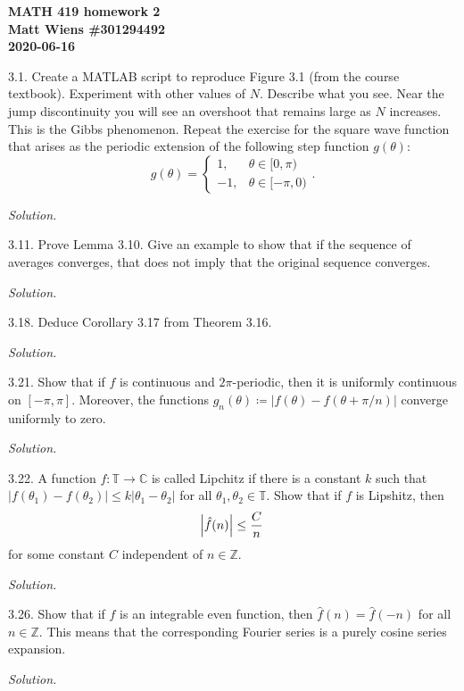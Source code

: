 \documentclass{article}
\newcommand{\C}{\mathbb{C}}
\newcommand{\T}{\mathbb{T}}
\newcommand{\Z}{\mathbb{Z}}
\begin{document}
\textbf{MATH 419 homework 2} \\
\textbf{Matt Wiens \#301294492} \\
\textbf{2020-06-16}

3.1. Create a MATLAB script to reproduce Figure 3.1 (from the course
  textbook). Experiment with other values of $N$. Describe what you see.
  Near the jump discontinuity you will see an overshoot that remains
  large as $N$ increases. This is the Gibbs phenomenon. Repeat the
  exercise for the square wave function that arises as the periodic
  extension of the following step function $g(\theta)$:
%
\begin{equation*}
    g(\theta) =
    \begin{cases}
        1,&\theta \in [0, \pi) \\
        -1,&\theta \in [- \pi, 0)
    \end{cases}
    .
\end{equation*}

\textit{Solution.}

\newpage

3.11. Prove Lemma 3.10. Give an example to show that if the sequence of
  averages converges, that does not imply that the original sequence
  converges.

\textit{Solution.}

\newpage

3.18. Deduce Corollary 3.17 from Theorem 3.16.

\textit{Solution.}

\newpage

3.21. Show that if $f$ is continuous and $2\pi$-periodic, then it is
  uniformly continuous on $[-\pi, \pi]$. Moreover, the functions
  $g_n(\theta) \coloneqq |f(\theta) - f(\theta + \pi/n)|$ converge
  uniformly to zero.

\textit{Solution.}

\newpage

3.22. A function $f: \T \to \C$ is called Lipchitz if there is a constant $k$ such that
$|f(\theta_1) - f(\theta_2)| \leq k |\theta_1 - \theta_2|$ for all
$\theta_1, \theta_2 \in \T$. Show that if $f$ is Lipshitz, then
%
\begin{equation*}
    \envert{\hat{f}(n)} \leq \frac{C}{n}
\end{equation*}
%
for some constant $C$ independent of $n \in \Z$.

\textit{Solution.}

\newpage

3.26. Show that if $f$ is an integrable even function, then $\hat{f}(n)
  = \hat{f}(-n)$ for all $n \in \Z$. This means that the corresponding
  Fourier series is a purely cosine series expansion.

\textit{Solution.}
\end{document}
